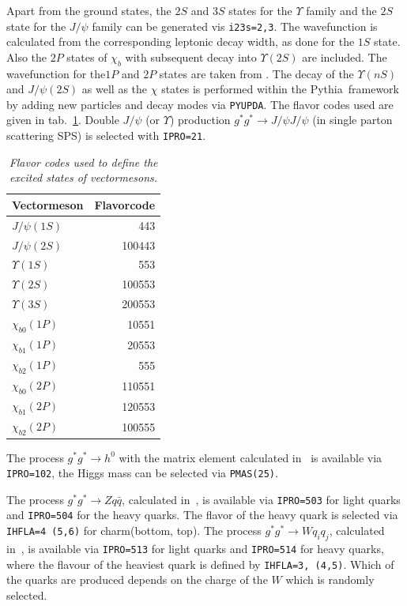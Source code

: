 \documentclass[11pt]{article} \usepackage{mystyle-new}
\def\PYTHIA{{\sc Pythia}}
\begin{document}
Apart from the ground states, the $2S$ and $3S$ states for the  $\Upsilon$ family and the $2S$ state for the $J/\psi$ family can be generated vis \verb+i23s=2,3+. The wavefunction is calculated from the corresponding leptonic decay width, as done for the $1S$ state. 
Also the $2P$ states of $\chi_b$ with subsequent decay into $\Upsilon(2S)$ are included. 
The wavefunction for the$1P$ and  $2P$ states are taken from \cite{Eichten:1995ch}.
The decay of the $\Upsilon(nS)$ and $J/\psi(2S)$ as well as the $\chi$ states is performed within the \PYTHIA\ framework by adding new particles and decay modes via \verb+PYUPDA+. 
The flavor codes used are given in tab.~\ref{flavorcode}.
Double $J/\psi$ (or $\Upsilon$) production $g^* g^* \to J/\psi J/\psi $  (in single parton scattering SPS) is selected with  \verb+IPRO=21+. 
\begin{table}[htp]
\begin{center}
\begin{tabular}{|l||r|}
\hline 
Vectormeson & Flavorcode \\
\hline
$J/\psi (1S) $ &443  \\
$J/\psi (2S) $ &100443  \\
$\Upsilon(1S)$& 553  \\
$\Upsilon(2S)$ &100553 \\
$\Upsilon(3S)$ &200553 \\
$\chi_{b0}(1P)$ &10551 \\
$\chi_{b1}(1P)$ & 20553\\
$\chi_{b2}(1P)$ & 555\\
$\chi_{b0}(2P)$ &110551 \\
$\chi_{b1}(2P)$ &120553  \\
$\chi_{b2}(2P)$ &100555  \\\hline
\end{tabular}
\caption{\it Flavor codes used to define the excited states of vectormesons.}\label{flavorcode}
\end{center}
\end{table}%
\par 
The process $g^*g^* \to  h^0 $ with the matrix element calculated 
in~\cite{hautmann-higgs} is
available via \verb+IPRO=102+, the Higgs mass can be selected via 
\verb+PMAS(25)+.

The process $g^*g^* \to  Z q\bar{q} $, calculated 
in~\cite{Baranov:2008hj,Deak:2008ky}, is
available via \verb"IPRO=503"  for light quarks and  \verb"IPRO=504"  for the heavy quarks. The flavor of the heavy quark is selected via \\
\verb"IHFLA=4 (5,6)"  for charm(bottom, top). 
The process $g^*g^* \to  W q_i q_j $, calculated 
in~\cite{Baranov:2008hj,Deak:2008ky}, is
available via \verb"IPRO=513" for light quarks and  \verb"IPRO=514" for heavy quarks, where the flavour of the heaviest quark is defined by \verb"IHFLA=3, (4,5)". Which of the quarks are produced depends on the charge of the $W$ which is randomly selected.
\end{document}
